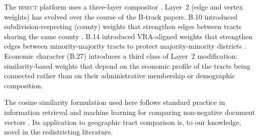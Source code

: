 The \textsc{bisect} platform uses a three-layer compositor
\citep{bisect2024}.
Layer~2 (edge and vertex weights) has evolved over the course of the
B-track papers.
B.10 introduced subdivision-respecting (county) weights that strengthen
edges between tracts sharing the same county \citep{b10county}.
B.14 introduced VRA-aligned weights that strengthen edges between
minority-majority tracts to protect majority-minority districts \citep{b14vra}.
Economic character (B.27) introduces a third class of Layer~2 modification:
similarity-based weights that depend on the economic profile of the tracts
being connected rather than on their administrative membership or
demographic composition.

The cosine similarity formulation used here follows standard practice in
information retrieval and machine learning for comparing non-negative
document vectors \citep{manning2008ir}.
Its application to geographic tract comparison is, to our knowledge, novel
in the redistricting literature.
